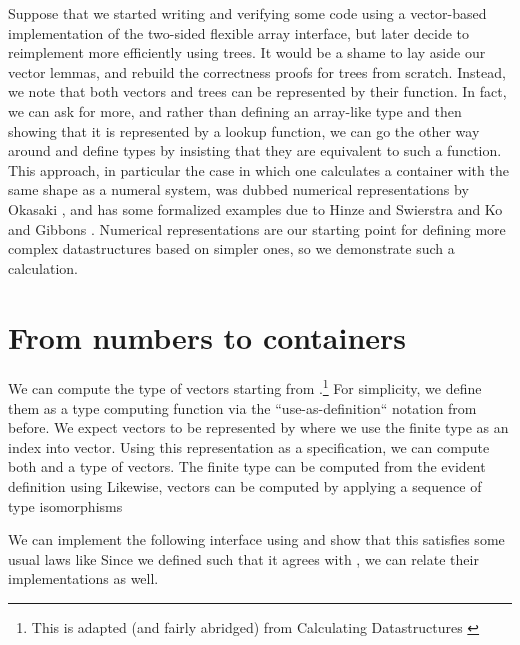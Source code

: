 Suppose that we started writing and verifying some code using a vector-based implementation of the two-sided flexible array interface, but later decide to reimplement more efficiently using trees. It would be a shame to lay aside our vector lemmas, and rebuild the correctness proofs for trees from scratch. Instead, we note that both vectors and trees can be represented by their  function. In fact, we can ask for more, and rather than defining an array-like type and then showing that it is represented by a lookup function, we can go the other way around and define types by insisting that they are equivalent to such a function. This approach, in particular the case in which one calculates a container with the same shape as a numeral system, was dubbed numerical representations by Okasaki \cite{purelyfunctional}, and has some formalized examples due to Hinze and Swierstra \cite{calcdata} and Ko and Gibbons \cite{progorn}. Numerical representations are our starting point for defining more complex datastructures based on simpler ones, so we demonstrate such a calculation. 

\section{From numbers to containers}\label{sec:numrep}
We can compute the type of vectors starting from \bN{}.\footnote{This is adapted (and fairly abridged) from Calculating Datastructures \cite{calcdata}} For simplicity, we define them as a type computing function via the ``use-as-definition`` notation from before. We expect vectors to be represented by 
where we use the finite type  as an index into vector. Using this representation as a specification, we can compute both  and a type of vectors. The finite type can be computed from the evident definition
using
Likewise, vectors can be computed by applying a sequence of type isomorphisms

We can implement the following interface using 
and show that this satisfies some usual laws like
Since we defined  such that it agrees with , we can relate their implementations as well.


